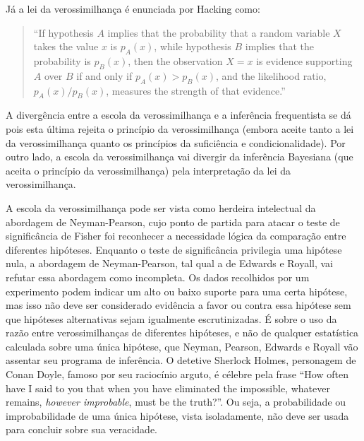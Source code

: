 Já a lei da verossimilhança é enunciada por Hacking como:

\begin{quote}
``If hypothesis $A$ implies that the probability that a random variable $X$ takes the value $x$ is $p_A(x)$, while
hypothesis $B$ implies that the probability is $p_B(x)$, then the observation $X=x$ is evidence supporting 
$A$ over $B$ if and only if $p_A(x) > p_B(x)$, and the likelihood ratio, $p_A(x)/p_B(x)$, measures the strength
 of that evidence.''
\citep{Hacking65}
\end{quote}

A divergência entre a escola da verossimilhança e a inferência frequentista se dá pois esta última rejeita o
princípio da verossimilhança (embora aceite tanto a lei da verossimilhança quanto os princípios da suficiência
e condicionalidade). Por outro lado, a escola da verossimilhança vai divergir da inferência Bayesiana (que aceita
o princípio da verossimilhança) pela interpretação da lei da verossimilhança.

A escola da verossimilhança pode ser vista como herdeira intelectual da abordagem de Neyman-Pearson, cujo ponto de partida
para atacar o teste de significância de Fisher foi reconhecer a
necessidade lógica da comparação entre diferentes hipóteses.
Enquanto o teste de significância privilegia uma hipótese nula, a abordagem de Neyman-Pearson, tal qual a de Edwards e Royall,
vai refutar essa abordagem como incompleta. Os dados recolhidos por um experimento podem indicar um alto ou baixo
suporte para uma certa hipótese, 
mas isso não deve ser considerado evidência a favor ou contra essa hipótese sem
que hipóteses alternativas sejam igualmente escrutinizadas. É sobre o uso da razão entre verossimilhanças de diferentes hipóteses,
e não de qualquer estatística calculada sobre uma única hipótese, que Neyman, Pearson, Edwards e Royall vão assentar seu
programa de inferência. O detetive Sherlock Holmes, personagem de Conan Doyle, famoso por seu raciocínio arguto, é célebre
pela frase ``How often have I said to you that when you have eliminated the impossible, whatever remains, {\em however 
improbable}, must be the truth?''. Ou seja, a probabilidade ou improbabilidade de uma única hipótese, vista
isoladamente, não deve ser usada para concluir sobre sua veracidade.


